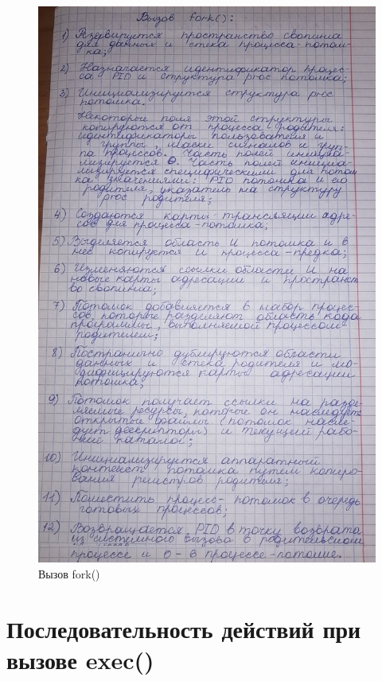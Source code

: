 \begin{figure}[H]
	\begin{center}
		\includegraphics[scale=0.2]{inc/fork.jpg}
	\end{center}
	\captionsetup{justification=centering}
	\caption{Вызов fork()}
	\label{img:fork}
\end{figure}

\section*{Последовательность действий при вызове exec()}

